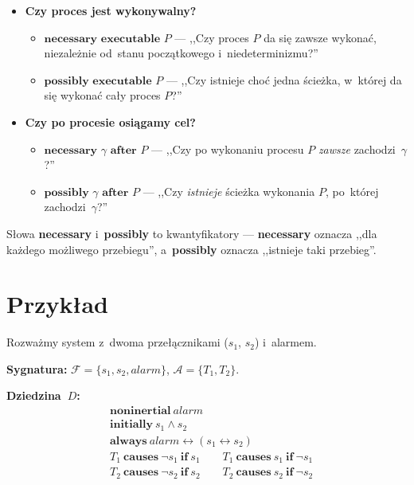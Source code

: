\documentclass[11pt,a4paper]{article}
\newcommand{\causes}{\textbf{causes}}
\newcommand{\aft}{\textbf{after}}
\renewcommand{\iff}{\textbf{if}}
\newcommand{\initially}{\textbf{initially}}
\newcommand{\always}{\textbf{always}}
\newcommand{\noninertial}{\textbf{noninertial}}
\newcommand{\necessary}{\textbf{necessary}}
\newcommand{\possibly}{\textbf{possibly}}
\newcommand{\executable}{\textbf{executable}}
\begin{document}
\begin{itemize}
  \item \textbf{Czy proces jest wykonywalny?}
    \begin{itemize}
      \item $\necessary$ $\executable$ $P$ --- ,,Czy proces $P$ da się zawsze wykonać,
        niezależnie od~stanu początkowego i~niedeterminizmu?''
      \item $\possibly$ $\executable$ $P$ --- ,,Czy istnieje choć jedna ścieżka,
        w~której da się wykonać cały proces $P$?''
    \end{itemize}

  \item \textbf{Czy po procesie osiągamy cel?}
    \begin{itemize}
      \item $\necessary$ $\gamma$ $\aft$ $P$ --- ,,Czy po wykonaniu procesu $P$
        \emph{zawsze} zachodzi~$\gamma$?''
      \item $\possibly$ $\gamma$ $\aft$ $P$ --- ,,Czy \emph{istnieje} ścieżka
        wykonania $P$, po~której zachodzi~$\gamma$?''
    \end{itemize}
\end{itemize}

Słowa \necessary{} i~\possibly{} to kwantyfikatory --- \necessary{} oznacza
,,dla każdego możliwego przebiegu'', a~\possibly{} oznacza ,,istnieje taki przebieg''.

\section{Przykład}

Rozważmy system z~dwoma przełącznikami ($s_1$, $s_2$) i~alarmem.

\medskip
\noindent\textbf{Sygnatura:}
$\mathcal{F} = \{s_1, s_2, \mathit{alarm}\}$, \quad
$\mathcal{A} = \{T_1, T_2\}$.

\medskip
\noindent\textbf{Dziedzina~$D$:}
\begin{align*}
  &\noninertial\ \mathit{alarm} \\
  &\initially\ s_1 \land s_2 \\
  &\always\ \mathit{alarm} \leftrightarrow (s_1 \leftrightarrow s_2) \\
  &T_1\ \causes\ \neg s_1\ \iff\ s_1
  \qquad T_1\ \causes\ s_1\ \iff\ \neg s_1 \\
  &T_2\ \causes\ \neg s_2\ \iff\ s_2
  \qquad T_2\ \causes\ s_2\ \iff\ \neg s_2
\end{align*}
\end{document}

